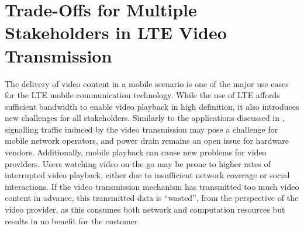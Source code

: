 \section{Trade-Offs for Multiple Stakeholders in LTE Video Transmission}\label{sec:application:lte_video}

\newcommand{\bandwidth}{\ensuremath{b_W}\xspace}
\newcommand{\bitrate}{\ensuremath{b_R}\xspace}
\newcommand{\timeplayedback}{\ensuremath{t_p}\xspace}

\newcommand{\streamingstart}{\ensuremath{\sigma}\xspace}
\newcommand{\bufferlower}{\ensuremath{\theta}\xspace}
\newcommand{\buffersize}{\ensuremath{\Theta}\xspace}

\newcommand{\ton}{\(T_{\texttt{ON}}\)\xspace}
\newcommand{\tdrxinactivity}{\(T_{\texttt{I}}\)\xspace}

\newcommand{\shortdrx}{\texttt{Short} \texttt{DRX}\xspace}
\newcommand{\tshortdrx}{\(T_{\texttt{S}}\)\xspace}
\newcommand{\longdrx}{\texttt{Long} \texttt{DRX}\xspace}
\newcommand{\tlongdrx}{\(T_{\texttt{L}}\)\xspace}
\newcommand{\rrcconnected}{\texttt{RRC\_Connected}\xspace}
\newcommand{\tidle}{\(T_{\texttt{Idle}}\)\xspace}
\newcommand{\tonidle}{\(T^{\texttt{Idle}}_{\texttt{ON}}\)\xspace}
\newcommand{\rrcidle}{\texttt{RRC\_Idle}\xspace}
\newcommand{\tdrxidle}{\(T^{\texttt{Idle}}_{\texttt{\gls{DRX}}}\)\xspace}
\newcommand{\promotiondelay}{\(D_P\)\xspace}

\newcommand{\bandwidthdown}{b_d\xspace}
\newcommand{\timedownloaded}{\ensuremath{t_d}\xspace}

\newcommand{\power}{P\xspace}
\newcommand{\energyconsumption}{\ensuremath{E}\xspace}
\newcommand{\connectioncount}{\ensuremath{C}\xspace}

\newcommand{\factordown}{\ensuremath{\alpha}\xspace}
\newcommand{\powerbaseline}{\ensuremath{\beta}\xspace}

\newcommand{\userabortrv}{\ensuremath{A}\xspace}
\newcommand{\userabortpdf}{\ensuremath{a}\xspace}
\newcommand{\meanwastedtraffic}{\ensuremath{W}\xspace}

\newcommand{\timeunwatched}{\ensuremath{t_u}\xspace}
\newcommand{\videolength}{l\xspace}

The delivery of video content in a mobile scenario is one of the major use cases for the \gls{LTE} mobile communication technology.
While the use of \gls{LTE} affords sufficient bandwidth to enable video playback in high definition, it also introduces new challenges for all stakeholders.
Similarly to the applications discussed in , signalling traffic induced by the video transmission may pose a challenge for mobile network operators, and power drain remains an open issue for hardware vendors.
Additionally, mobile playback can cause new problems for video providers.
Users watching video on the go may be prone to higher rates of interrupted video playback, either due to insufficient network coverage or social interactions.
If the video transmission mechanism has transmitted too much video content in advance, this transmitted data is ``wasted'', from the perspective of the video provider, as this consumes both network and computation resources but results in no benefit for the customer.


